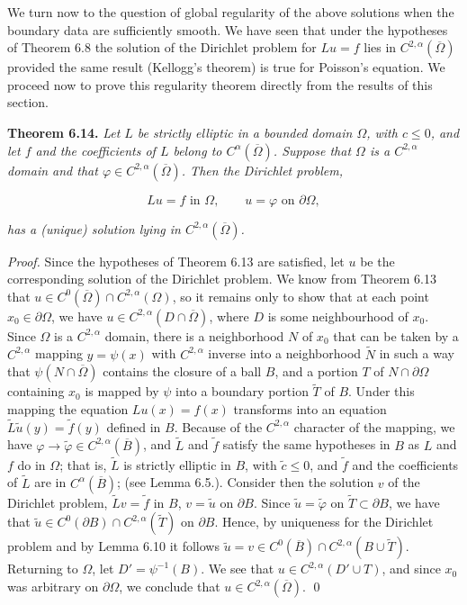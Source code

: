 We turn now to the question of global regularity of the above solutions when
the boundary data are sufficiently smooth. We have seen that under the hypotheses
of Theorem 6.8 the solution of the Dirichlet problem for $Lu=f$ lies in $C^{2,\alpha}(\overline{\Omega})$
provided the same result (Kellogg's theorem) is true for Poisson's equation. We proceed now to prove this regularity theorem directly from the results of this section.

\textbf{Theorem 6.14.} \textit{Let $L$ be strictly elliptic in a bounded domain $\Omega$, with $c\leq 0$, and
let $f$ and the coefficients of $L$ belong to $C^\alpha(\overline{\Omega})$. Suppose that $\Omega$ is a $C^{2,\alpha}$ domain
and that $\varphi\in C^{2,\alpha}(\overline{\Omega})$. Then the Dirichlet problem,}

\[
Lu=f \text{ in } \Omega, \qquad u=\varphi \text{ on } \partial\Omega,
\]

\textit{has a (unique) solution lying in $C^{2,\alpha}(\overline{\Omega})$.}

\textit{Proof.} Since the hypotheses of Theorem 6.13 are satisfied, let $u$ be the corresponding solution of the Dirichlet problem. We know from Theorem 6.13 that
$u\in C^0(\overline{\Omega})\cap C^{2,\alpha}(\Omega)$, so it remains only to show that at each point $x_0\in \partial\Omega$, we have
$u\in C^{2,\alpha}(D\cap \overline{\Omega})$, where $D$ is some neighbourhood of $x_0$. Since $\Omega$ is a $C^{2,\alpha}$ domain,
there is a neighborhood $N$ of $x_0$ that can be taken by a $C^{2,\alpha}$ mapping $y=\psi(x)$ with
$C^{2,\alpha}$ inverse into a neighborhood $\widetilde N$ in such a way that $\psi(N\cap \overline{\Omega})$ contains the
closure of a ball $B$, and a portion $T$ of $N\cap \partial\Omega$ containing $x_0$ is mapped by $\psi$ into a
boundary portion $\widetilde T$ of $B$. Under this mapping the equation $Lu(x)=f(x)$ transforms
into an equation $\widetilde L\widetilde u(y)=\widetilde f(y)$ defined in $B$. Because of the $C^{2,\alpha}$ character of the
mapping, we have $\varphi\to\widetilde\varphi\in C^{2,\alpha}(\overline{B})$, and $\widetilde L$ and $\widetilde f$ satisfy the same hypotheses in
$B$ as $L$ and $f$ do in $\Omega$; that is, $\widetilde L$ is strictly elliptic in $B$, with $\widetilde c\leq 0$, and $\widetilde f$ and the
coefficients of $\widetilde L$ are in $C^\alpha(\overline{B})$; (see Lemma 6.5.). Consider then the solution $v$ of the
Dirichlet problem, $\widetilde L v=\widetilde f$ in $B$, $v=\widetilde u$ on $\partial B$. Since $\widetilde u=\widetilde\varphi$ on $\widetilde T\subset \partial B$, we have
that $\widetilde u\in C^0(\partial B)\cap C^{2,\alpha}(\widetilde T)$ on $\partial B$. Hence, by uniqueness for the Dirichlet
problem and by Lemma 6.10 it follows $\widetilde u=v\in C^0(\overline{B})\cap C^{2,\alpha}(B\cup \widetilde T)$. Returning
to $\Omega$, let $D'=\psi^{-1}(B)$. We see that $u\in C^{2,\alpha}(D'\cup T)$, and since $x_0$ was arbitrary on
$\partial\Omega$, we conclude that $u\in C^{2,\alpha}(\overline{\Omega})$. \qed

